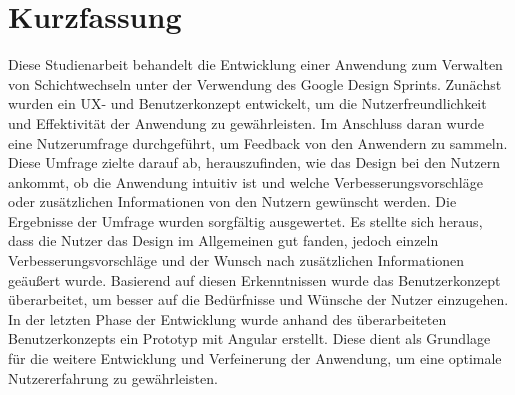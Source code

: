 \section*{Kurzfassung}
Diese Studienarbeit behandelt die Entwicklung einer Anwendung zum Verwalten von Schichtwechseln unter der Verwendung des Google Design Sprints. Zunächst wurden ein UX- und Benutzerkonzept entwickelt, um die Nutzerfreundlichkeit und Effektivität der Anwendung zu gewährleisten. Im Anschluss daran wurde eine Nutzerumfrage durchgeführt, um Feedback von den Anwendern zu sammeln. Diese Umfrage zielte darauf ab, herauszufinden, wie das Design bei den Nutzern ankommt, ob die Anwendung intuitiv ist und welche Verbesserungsvorschläge oder zusätzlichen Informationen von den Nutzern gewünscht werden. Die Ergebnisse der Umfrage wurden sorgfältig ausgewertet. Es stellte sich heraus, dass die Nutzer das Design im Allgemeinen gut fanden, jedoch einzeln Verbesserungsvorschläge und der Wunsch nach zusätzlichen Informationen geäußert wurde. Basierend auf diesen Erkenntnissen wurde das Benutzerkonzept überarbeitet, um besser auf die Bedürfnisse und Wünsche der Nutzer einzugehen. In der letzten Phase der Entwicklung wurde anhand des überarbeiteten Benutzerkonzepts ein Prototyp mit Angular erstellt. Diese dient als Grundlage für die weitere Entwicklung und Verfeinerung der Anwendung, um eine optimale Nutzererfahrung zu gewährleisten.